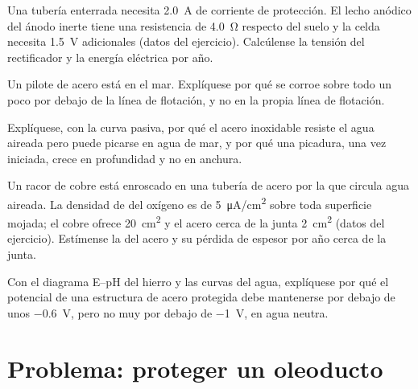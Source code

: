 \begin{exercise}[$\star\star$]\label{exo:b2:corrosion:8}
Una tubería enterrada necesita \qty{2.0}{A} de corriente de protección. El lecho anódico del
ánodo inerte tiene una resistencia de \qty{4.0}{\ohm} respecto del suelo y la celda necesita
\qty{1.5}{V} adicionales (datos del ejercicio). Calcúlense la tensión del rectificador y la
energía eléctrica por año.
\end{exercise}

\begin{exercise}[$\star\star$]\label{exo:b2:corrosion:9}
Un pilote de acero está en el mar. Explíquese por qué se corroe sobre todo un poco por debajo de
la línea de flotación, y no en la propia línea de flotación.
\end{exercise}

\begin{exercise}[$\star\star\star$]\label{exo:b2:corrosion:10}
Explíquese, con la curva pasiva, por qué el acero inoxidable resiste el agua aireada pero
puede picarse en agua de mar, y por qué una picadura, una vez iniciada, crece en profundidad y no
en anchura.
\end{exercise}

\begin{exercise}[$\star\star\star$]\label{exo:b2:corrosion:11}
Un racor de cobre está enroscado en una tubería de acero por la que circula agua aireada. La
densidad de  del oxígeno es de \qty{5}{\micro A/cm^2} sobre toda superficie mojada; el
cobre ofrece \qty{20}{cm^2} y el acero cerca de la junta \qty{2}{cm^2}
(datos del ejercicio). Estímense la  del acero y su pérdida de
espesor por año cerca de la junta.
\end{exercise}

\begin{exercise}[$\star\star\star$]\label{exo:b2:corrosion:12}
Con el diagrama E--pH del hierro y las curvas del agua, explíquese por qué el
potencial de una estructura de acero protegida debe mantenerse por debajo de unos
\qty{-0.6}{V}, pero no muy por debajo de \qty{-1}{V}, en agua neutra.
\end{exercise}

\section{Problema: proteger un oleoducto}

